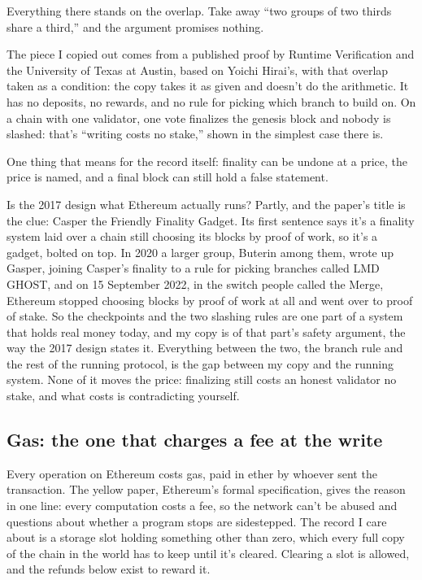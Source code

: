 \documentclass[11pt,twoside]{article}
\theoremstyle{thielethm}
\theoremstyle{thieledef}
\theoremstyle{thieledef}
\theoremstyle{thieledef}
\theoremstyle{thielethm}
\theoremstyle{thieleobs}
\theoremstyle{thielethm}
\begin{document}
Everything there stands on the overlap. Take away ``two groups of two thirds share a third,'' and the argument promises nothing.

The piece I copied out comes from a published proof by Runtime Verification and the University of Texas at Austin, based on Yoichi Hirai's, with that overlap taken as a condition: the copy takes it as given and doesn't do the arithmetic. It has no deposits, no rewards, and no rule for picking which branch to build on. On a chain with one validator, one vote finalizes the genesis block and nobody is slashed: that's ``writing costs no stake,'' shown in the simplest case there is.

One thing that means for the record itself: finality can be undone at a price, the price is named, and a final block can still hold a false statement.

Is the 2017 design what Ethereum actually runs? Partly, and the paper's title is the clue: Casper the Friendly Finality Gadget. Its first sentence says it's a finality system laid over a chain still choosing its blocks by proof of work, so it's a gadget, bolted on top. In 2020 a larger group, Buterin among them, wrote up Gasper, joining Casper's finality to a rule for picking branches called LMD GHOST, and on 15 September 2022, in the switch people called the Merge, Ethereum stopped choosing blocks by proof of work at all and went over to proof of stake. So the checkpoints and the two slashing rules are one part of a system that holds real money today, and my copy is of that part's safety argument, the way the 2017 design states it. Everything between the two, the branch rule and the rest of the running protocol, is the gap between my copy and the running system. None of it moves the price: finalizing still costs an honest validator no stake, and what costs is contradicting yourself.

\subsection{Gas: the one that charges a fee at the write}

Every operation on Ethereum costs gas, paid in ether by whoever sent the transaction. The yellow paper, Ethereum's formal specification, gives the reason in one line: every computation costs a fee, so the network can't be abused and questions about whether a program stops are sidestepped. The record I care about is a storage slot holding something other than zero, which every full copy of the chain in the world has to keep until it's cleared. Clearing a slot is allowed, and the refunds below exist to reward it.
\end{document}
